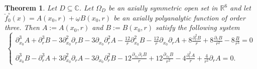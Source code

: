 \documentclass[reqno,11pt]{amsart}
\numberwithin{equation}{section}
\newtheorem{theorem}{Theorem}[section]
\theoremstyle{definition}
\begin{document}
\begin{theorem}
Let $D \subseteq \mathbb{C}$. Let $\Omega_D$ be an axially symmetric open set in $ \mathbb{R}^6$ and let $\breve{f}^{\circ}_0(x)=A(x_0,r)+ \underline{\omega}B(x_0,r)$ be an axially polyanalytic function of order three. Then $A:=A(x_0,r)$ and $B:=B(x_0,r)$ satisfy the following system
$$ \begin{cases}
\partial_{x_0}^3A+\partial_r^3 B-3 \partial_{x_0}^2 \partial_r B-3 \partial_{x_0} \partial_r^2A-\frac{12}{r}  \partial_{x_0}^2 B- \frac{12}{r} \partial_{x_0}\partial_{r} A+ 8 \frac{\partial_r^2 B}{r}+8 \frac{\partial_r B}{r^2}-8\frac{B}{r^3}=0\\
\\
\partial_{x_0}^3 B- \partial_{r}^3 A +3 \partial_{x_0}^2 \partial_{r} A-3 \partial_{x_0} \partial_{r}^2 B- 12 \frac{\partial_{x_0} \partial_{r}B}{r}+12 \frac{\partial_{x_0} B}{r^2}-4 \frac{\partial_{r}^2 A}{r}+ \frac{4}{r^2}\partial_r A=0.
\end{cases}
$$
\end{theorem}
\end{document}
